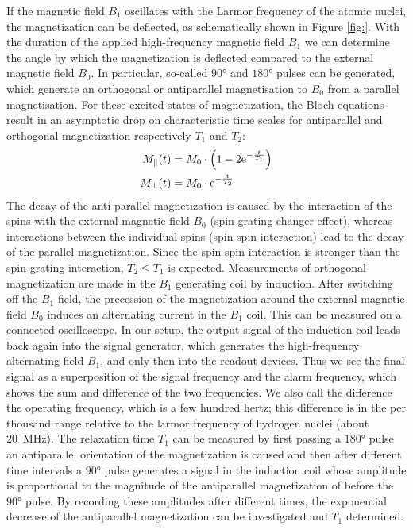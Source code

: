 If the magnetic field $B_1$ oscillates with the Larmor frequency of the atomic nuclei, the magnetization can be deflected, as schematically shown in Figure \ref{fig:}.
With the duration of the applied high-frequency magnetic field $B_1$ we can determine the angle by which the magnetization is deflected compared to the external magnetic field $B_0$.
In particular, so-called $\ang{90}$ and $\ang{180}$ pulses can be generated, which generate an orthogonal or antiparallel magnetisation to $B_0$ from a parallel magnetisation.
For these excited states of magnetization, the Bloch equations result in an asymptotic drop on characteristic time scales for antiparallel and orthogonal magnetization respectively $T_1$ and $T_2$:
\begin{align}
M_\parallel(t)&=M_0\cdot\left(1-2\mathrm{e}^{-\frac{t}{T_1}}\right)\\
M_\bot(t)&=M_0\cdot\mathrm{e}^{-\frac{t}{T_2}}
\end{align}
The decay of the anti-parallel magnetization is caused by the interaction of the spins with the external magnetic field $B_0$ (spin-grating changer effect), whereas interactions between the individual spins (spin-spin interaction) lead to the decay of the parallel magnetization.
Since the spin-spin interaction is stronger than the spin-grating interaction, $T_2\leq T_1$ is expected.
Measurements of orthogonal magnetization are made in the $B_1$ generating coil by induction.
After switching off the $B_1$ field, the precession of the magnetization around the external magnetic field $B_0$ induces an alternating current in the $B_1$ coil.
This can be measured on a connected oscilloscope.
In our setup, the output signal of the induction coil leads back again into the signal generator, which generates the high-frequency alternating field $B_1$, and only then into the readout devices.
Thus we see the final signal as a superposition of the signal frequency and the alarm frequency, which shows the sum and difference of the two frequencies.
We also call the difference the operating frequency, which is a few hundred hertz; this difference is in the per thousand range relative to the larmor frequency of hydrogen nuclei (about \SI{20}{\mega\hertz}).
The relaxation time $T_1$ can be measured by first passing a $\ang{180}$ pulse
an antiparallel orientation of the magnetization is caused and then after different time intervals a $\ang{90}$ pulse generates a signal in the induction coil whose amplitude is proportional to the magnitude of the antiparallel magnetization of before the $\ang{90}$ pulse.
By recording these amplitudes after different times, the exponential decrease of the antiparallel magnetization can be investigated and $T_1$ determined.
